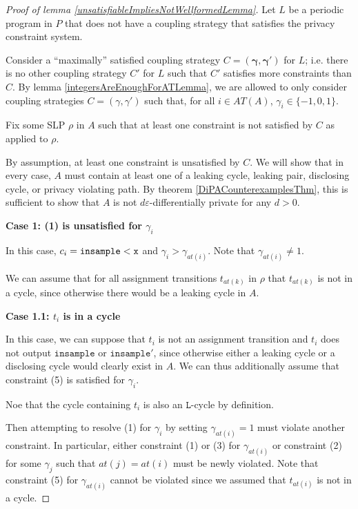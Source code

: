 \begin{proof}[Proof of lemma \ref{unsatisfiableImpliesNotWellformedLemma}]
    Let $L$ be a periodic program in $P$ that does not have a coupling strategy that satisfies the privacy constraint system.

    Consider a ``maximally'' satisfied coupling strategy $C=(\mathbf{\gamma}, \mathbf{\gamma}')$ for $L$; i.e. there is no other coupling strategy $C'$ for $L$ such that $C'$ satisfies more constraints than $C$. By lemma \ref{integersAreEnoughForATLemma}, we are allowed to only consider coupling strategies $C=(\gamma, \gamma')$ such that, for all $i\in AT(A)$, $\gamma_i \in \{-1, 0, 1\}$. 

    Fix some SLP $\rho$ in $A$ such that at least one constraint is not satisfied by $C$ as applied to $\rho$.

    By assumption, at least one constraint is unsatisfied by $C$. We will show that in every case, $A$ must contain at least one of a leaking cycle, leaking pair, disclosing cycle, or privacy violating path. By theorem \ref{DiPACounterexamplesThm}, this is sufficient to show that $A$ is not $d\varepsilon$-differentially private for any $d>0$.

    \textbf{Case 1: (1) is unsatisfied for $\gamma_i$}
    
    In this case, $c_i = \lguard[\texttt{x}]$ and $\gamma_i > \gamma_{at(i)}$. Note that $\gamma_{at(i)} \neq 1$. 

    We can assume that for all assignment transitions $t_{at(k)}$ in $\rho$ that $t_{at(k)}$ is not in a cycle, since otherwise there would be a leaking cycle in $A$. 

    \textbf{Case 1.1: $t_i$ is in a cycle}

    In this case, we can suppose that $t_i$ is not an assignment transition and $t_i$ does not output $\texttt{insample}$ or $\texttt{insample}'$, since otherwise either a leaking cycle or a disclosing cycle would clearly exist in $A$. We can thus additionally assume that constraint (5) is satisfied for $\gamma_i$. 
    
    Noe that the cycle containing $t_i$ is also an $\texttt{L}$-cycle by definition.

    Then attempting to resolve (1) for $\gamma_i$ by setting $\gamma_{at(i)} = 1$ must violate another constraint. In particular, either constraint (1) or (3) for $\gamma_{at(i)}$ or constraint (2) for some $\gamma_j$ such that $at(j) = at(i)$ must be newly violated. Note that constraint (5) for $\gamma_{at(i)}$ cannot be violated since we assumed that $t_{at(i)}$ is not in a cycle. 


\end{proof}
